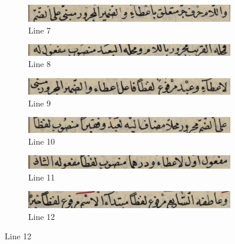 \begin{figure}[H]
     \hfill%
     \begin{subfigure}[b]{0.3\textwidth}
         \centering
         \includegraphics[width=\textwidth]{images/lines/_7.png}
         \caption{Line 7}
     \end{subfigure}
     \hfill%
     \begin{subfigure}[b]{0.3\textwidth}
         \centering
         \includegraphics[width=\textwidth]{images/lines/_8.png}
         \caption{Line 8}
     \end{subfigure}
     \hfill%
     \begin{subfigure}[b]{0.3\textwidth}
         \centering
         \includegraphics[width=\textwidth]{images/lines/_9.png}
         \caption{Line 9}
     \end{subfigure}
     \hfill%
     \begin{subfigure}[b]{0.3\textwidth}
         \centering
         \includegraphics[width=\textwidth]{images/lines/_10.png}
         \caption{Line 10}
     \end{subfigure}
     \hfill%
     \begin{subfigure}[b]{0.3\textwidth}
         \centering
         \includegraphics[width=\textwidth]{images/lines/_11.png}
         \caption{Line 11}
     \end{subfigure}
     \hfill%
     \begin{subfigure}[b]{0.3\textwidth}
         \centering
         \includegraphics[width=\textwidth]{images/lines/_12.png}
         \caption{Line 12}
     \end{subfigure}
     \hfill%

\end{figure}
